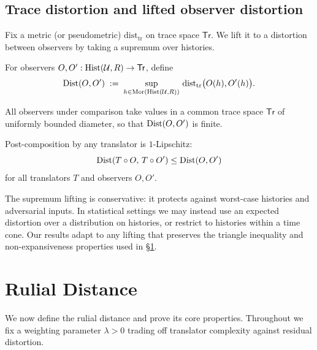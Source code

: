 \documentclass{aion}
\newcommand{\Tr}{\mathsf{Tr}}
\DeclareMathOperator{\Mor}{Mor}
\providecommand{\sectionbreak}{\clearpage}
\begin{document}
\subsection{Trace distortion and lifted observer distortion}
\label{subsec:distortion}

Fix a metric (or pseudometric) $\mathrm{dist}_{\mathrm{tr}}$ on trace space $\Tr$.
We lift it to a distortion between observers by taking a supremum over histories.

\begin{definition}\label{def:dist-lift}
For observers $O,O':\Hist(\mathcal{U},R)\to\Tr$, define
\[
  \Dist(O,O') \;:=\; \sup_{h\in\Mor(\Hist(\mathcal{U},R))}\,
  \mathrm{dist}_{\mathrm{tr}}\bigl(O(h),O'(h)\bigr).
\]
\end{definition}

\begin{assumption}\label{ass:bounded-diameter}
All observers under comparison take values in a common trace space $\Tr$ of uniformly bounded diameter,
so that $\operatorname{Dist}(O,O')$ is finite.
\end{assumption}

\begin{assumption}\label{ass:lipschitz}
Post-composition by any translator is $1$-Lipschitz:
\[
  \operatorname{Dist}(T\circ O,\, T\circ O') \le \operatorname{Dist}(O,O')
\]
for all translators $T$ and observers $O,O'$.
\end{assumption}

\begin{remark}
The supremum lifting is conservative: it protects against worst-case histories and adversarial inputs.
In statistical settings we may instead use an expected distortion over a distribution on histories, or restrict to histories within a time cone.
Our results adapt to any lifting that preserves the triangle inequality and non-expansiveness properties used in \S\ref{sec:rulial}.
\end{remark}

\sectionbreak

\section{Rulial Distance}
\label{sec:rulial}

We now define the rulial distance and prove its core properties.
Throughout we fix a weighting parameter $\lambda>0$ trading off translator complexity against residual distortion.
\end{document}

